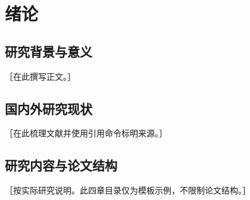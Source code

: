\chapter{绪论}
\label{chap:introduction}
\section{研究背景与意义}
［在此撰写正文。］
\section{国内外研究现状}
［在此梳理文献并使用引用命令标明来源。］
\section{研究内容与论文结构}
［按实际研究说明。此四章目录仅为模板示例，不限制论文结构。］

